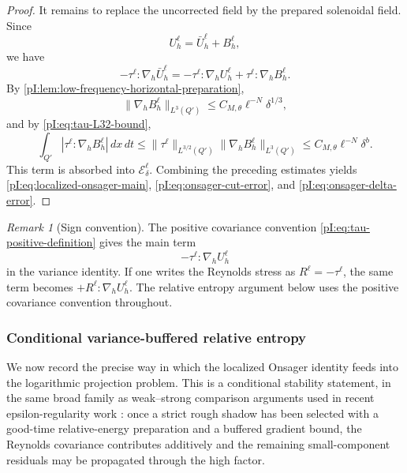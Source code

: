 \documentclass[11pt]{article}
\numberwithin{equation}{section}
\theoremstyle{plain}
\theoremstyle{definition}
\theoremstyle{remark}
\newtheorem{remark}{Remark}[section]
\newcommand{\nabh}{\nabla_h}
\begin{document}
\begin{proof}
It remains to replace the uncorrected field by the prepared solenoidal field.  Since
\[
        U_h^\ell=\bar U_h^\ell+B_h^\ell,
\]
we have
\[
        -\tau^\ell:\nabh\bar U_h^\ell
        =
        -\tau^\ell:\nabh U_h^\ell
        +\tau^\ell:\nabh B_h^\ell.
\]
By \cref{pI:lem:low-frequency-horizontal-preparation},
\[
        \|\nabh B_h^\ell\|_{L^3(Q')}
        \le C_{M,\theta}\ell^{-N}\delta^{1/3},
\]
and by \eqref{pI:eq:tau-L32-bound},
\[
        \int_{Q'}|\tau^\ell:\nabh B_h^\ell|\,dx\,dt
        \le
        \|\tau^\ell\|_{L^{3/2}(Q')}
        \|\nabh B_h^\ell\|_{L^3(Q')}
        \le C_{M,\theta}\ell^{-N}\delta^b.
\]
This term is absorbed into \(\mathcal E_\delta^\ell\).  Combining the preceding estimates yields \eqref{pI:eq:localized-onsager-main}, \eqref{pI:eq:onsager-cut-error}, and \eqref{pI:eq:onsager-delta-error}.
\end{proof}

\begin{remark}[Sign convention]\label{pI:rem:tau-sign-convention}
The positive covariance convention \eqref{pI:eq:tau-positive-definition} gives the main term
\[
        -\tau^\ell:\nabh U_h^\ell
\]
in the variance identity.  If one writes the Reynolds stress as \(R^\ell=-\tau^\ell\), the same term becomes \(+R^\ell:\nabh U_h^\ell\).  The relative entropy argument below uses the positive covariance convention throughout.
\end{remark}

\subsubsection{Conditional variance-buffered relative entropy}\label{pI:subsec:relative-entropy-reduction}

We now record the precise way in which the localized Onsager identity feeds into the logarithmic projection problem.  This is a conditional stability statement, in the same broad family as weak--strong comparison arguments used in recent epsilon-regularity work \cite{AlbrittonBarkerPrange2023}: once a strict rough shadow has been selected with a good-time relative-energy preparation and a buffered gradient bound, the Reynolds covariance contributes additively and the remaining small-component residuals may be propagated through the high factor.
\end{document}
